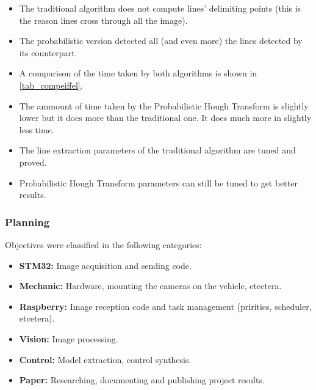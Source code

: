 \begin{itemize}
	\item The traditional algorithm does not compute lines' delimiting points (this is the reason lines cross through all the image).
	\item The probabilistic version detected all (and even more) the lines detected by its counterpart.
	\item A comparison of the time taken by both algorithms is shown in \ref{tab_compeiffel}.
	\item The ammount of time taken by the Probabilistic Hough Transform is slightly lower but it does more than the traditional one. It does much more in slightly less time.
	\item The line extraction parameters of the traditional algorithm are tuned and proved.
	\item Probabilistic Hough Transform parameters can still be tuned to get better results.
\end{itemize}


\subsubsection{Planning}
Objectives were classified in the following categories:
\begin{itemize}
	\item \textbf{STM32:} Image acquisition and sending code.
	\item \textbf{Mechanic:} Hardware, mounting the cameras on the vehicle, etcetera.
	\item \textbf{Raspberry:} Image reception code and task management (pririties, scheduler, etcetera).
	\item \textbf{Vision:} Image processing.
	\item \textbf{Control:} Model extraction, control synthesis.
	\item \textbf{Paper:} Researching, documenting and publishing project results.
\end{itemize}
